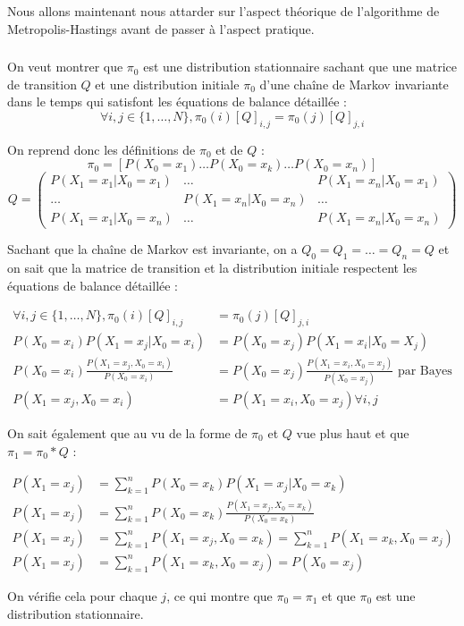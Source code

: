 Nous allons maintenant nous attarder sur l'aspect théorique de l'algorithme de 
Metropolis-Hastings avant de passer à l'aspect pratique.

\subsubsection{}
On veut montrer que $\pi_0$ est une distribution stationnaire sachant que une matrice de transition $Q$ et une distribution initiale $\pi_0$ 
d'une chaîne de Markov invariante dans le temps qui satisfont les équations de balance détaillée :
\begin{equation*}
  \forall i,j \in \{ 1,\dots,N \}, \pi_0(i)[Q]_{i,j} = \pi_0(j)[Q]_{j,i}
\end{equation*}

On reprend donc les définitions de $\pi_0$ et de $Q$ :
\begin{equation*}
  \pi_0 = [P(X_0=x_1) \dots P(X_0=x_k) \dots P(X_0=x_n)]
\end{equation*}
$$Q = \begin{pmatrix}
  P(X_1 = x_1|X_0=x_1) & \dots & P(X_1 = x_n|X_0=x_1)\\
  \dots & P(X_1 = x_n|X_0=x_n) & \dots\\
  P(X_1 = x_1|X_0=x_n) & \dots & P(X_1 = x_n|X_0=x_n)
\end{pmatrix}$$

Sachant que la chaîne de Markov est invariante, on a $Q_0 = Q_1 = \dots = Q_n = Q$ et on sait que la matrice de transition et la distribution initiale respectent les équations de balance détaillée :

\begin{align*}
  \forall i,j \in \{ 1,\dots,N \}, \pi_0(i)[Q]_{i,j} &= \pi_0(j)[Q]_{j,i}\\
  P(X_0=x_i)P(X_1=x_j|X_0=x_i) &= P(X_0 = x_j)P(X_1=x_i|X_0=X_j)\\
  P(X_0=x_i)\frac{P(X_1=x_j,X_0=x_i)}{P(X_0=x_i)} &= P(X_0=x_j)\frac{P(X_1=x_i,X_0=x_j)}{P(X_0=x_j)} \text{ par Bayes}\\
  P(X_1=x_j,X_0=x_i) &= P(X_1=x_i,X_0=x_j) \forall i,j
\end{align*}

On sait également que au vu de la forme de $\pi_0$ et $Q$ vue plus haut et que $\pi_1 = \pi_0 * Q$ :

\begin{align*}
  P(X_1=x_j) &= \sum_{k=1}^n P(X_0=x_k)P(X_1=x_j|X_0=x_k)\\
  P(X_1=x_j) &= \sum_{k=1}^n P(X_0=x_k)\frac{P(X_1=x_j,X_0=x_k)}{P(X_0=x_k)}\\
  P(X_1=x_j) &= \sum_{k=1}^n P(X_1=x_j,X_0=x_k) = \sum_{k=1}^n P(X_1=x_k,X_0=x_j)\\
  P(X_1=x_j) &= \sum_{k=1}^n P(X_1=x_k,X_0=x_j) = P(X_0=x_j)
\end{align*}

On vérifie cela pour chaque $j$, ce qui montre que $\pi_0 = \pi_1$ et que $\pi_0$ est une distribution stationnaire. 

\subsubsection{}


